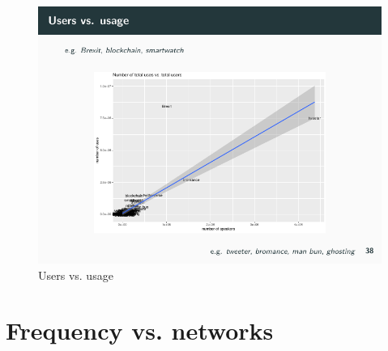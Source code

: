 \documentclass[
  a4paper,
  ]{scrartcl}
\begin{document}
      \begin{figure}[H]
        \centering
        \includegraphics[width=\linewidth, height=.8\textheight, keepaspectratio]{images/users-vs-usage.pdf}
        \caption{Users vs. usage}
      \end{figure}

\section{Frequency vs. networks}


  \printbibliography
\end{document}

